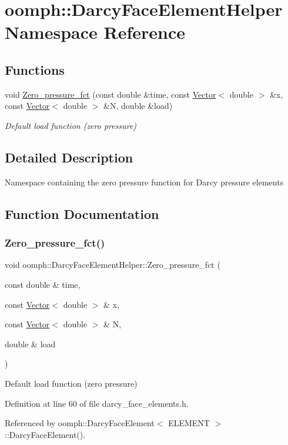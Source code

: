 \hypertarget{namespaceoomph_1_1DarcyFaceElementHelper}{}\section{oomph\+:\+:Darcy\+Face\+Element\+Helper Namespace Reference}
\label{namespaceoomph_1_1DarcyFaceElementHelper}
\subsection*{Functions}
\begin{DoxyCompactItemize}
\item 
void \hyperlink{namespaceoomph_1_1DarcyFaceElementHelper_a088969b1cd5f0c561db82bb4f1697546}{Zero\+\_\+pressure\+\_\+fct} (const double \&time, const \hyperlink{classoomph_1_1Vector}{Vector}$<$ double $>$ \&x, const \hyperlink{classoomph_1_1Vector}{Vector}$<$ double $>$ \&N, double \&load)
\begin{DoxyCompactList}\small\item\em Default load function (zero pressure) \end{DoxyCompactList}\end{DoxyCompactItemize}


\subsection{Detailed Description}
Namespace containing the zero pressure function for Darcy pressure elements 

\subsection{Function Documentation}
\mbox{\label{namespaceoomph_1_1DarcyFaceElementHelper_a088969b1cd5f0c561db82bb4f1697546}} 
\subsubsection{\texorpdfstring{Zero\+\_\+pressure\+\_\+fct()}{Zero\_pressure\_fct()}}
{\footnotesize\ttfamily void oomph\+::\+Darcy\+Face\+Element\+Helper\+::\+Zero\+\_\+pressure\+\_\+fct (\begin{DoxyParamCaption}\item[{const double \&}]{time,  }\item[{const \hyperlink{classoomph_1_1Vector}{Vector}$<$ double $>$ \&}]{x,  }\item[{const \hyperlink{classoomph_1_1Vector}{Vector}$<$ double $>$ \&}]{N,  }\item[{double \&}]{load }\end{DoxyParamCaption})}



Default load function (zero pressure) 



Definition at line 60 of file darcy\+\_\+face\+\_\+elements.\+h.



Referenced by oomph\+::\+Darcy\+Face\+Element$<$ E\+L\+E\+M\+E\+N\+T $>$\+::\+Darcy\+Face\+Element().

